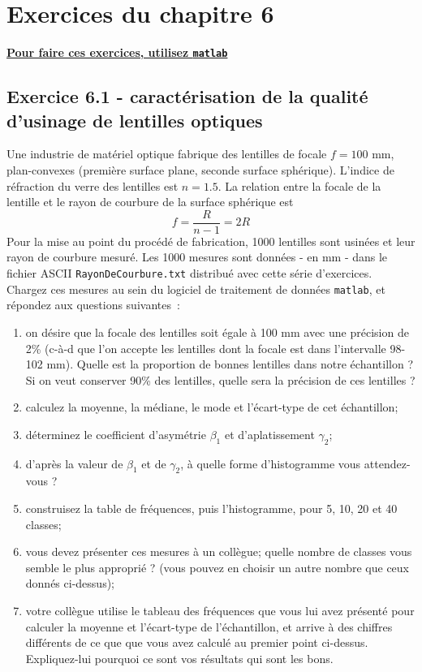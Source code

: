 \section{Exercices du chapitre 6}

\begin{center}
\Large \bf {\underline{Pour faire ces exercices, utilisez \texttt{matlab}}}
\end{center}

\subsection*{Exercice 6.1 - caractérisation de la qualité d'usinage de lentilles optiques}

Une industrie de matériel optique fabrique des lentilles de focale $f=100$ mm, plan-convexes (première surface plane, seconde surface sphérique). L'indice de réfraction du verre des lentilles est $n=1.5$. La relation entre la focale de la lentille et le rayon de courbure de la surface sphérique est
$$
f=\frac{R}{n-1}=2R
$$
Pour la mise au point du procédé de fabrication, 1000 lentilles sont usinées et leur rayon de courbure mesuré. Les 1000 mesures sont données - en mm - dans le fichier ASCII \texttt{RayonDeCourbure.txt} distribué avec cette série d'exercices. Chargez ces mesures au sein du logiciel de traitement de données \texttt{matlab}, et répondez aux questions suivantes~:
\begin{enumerate}
\item on désire que la focale des lentilles soit égale à 100 mm avec une précision de 2\% (c-à-d que l'on accepte les lentilles dont la focale est dans l'intervalle 98-102 mm). Quelle est la proportion de bonnes lentilles dans notre échantillon ? Si on veut conserver 90\% des lentilles, quelle sera la précision de ces lentilles ?
\item calculez la moyenne, la médiane, le mode et l'écart-type de cet échantillon;
\item déterminez le coefficient d'asymétrie $\beta_1$ et d'aplatissement $\gamma_2$;
\item d'après la valeur de $\beta_1$ et de $\gamma_2$, à quelle forme d'histogramme vous attendez-vous ?
\item construisez la table de fréquences, puis l'histogramme, pour 5, 10, 20 et 40 classes;
\item vous devez présenter ces mesures à un collègue; quelle nombre de classes vous semble le plus approprié ? (vous pouvez en choisir un autre nombre que ceux donnés ci-dessus);
\item votre collègue utilise le tableau des fréquences que vous lui avez présenté pour calculer la moyenne et l'écart-type de l'échantillon, et arrive à des chiffres différents de ce que que vous avez calculé au premier point ci-dessus. Expliquez-lui pourquoi ce sont vos résultats qui sont les bons.
\end{enumerate}

